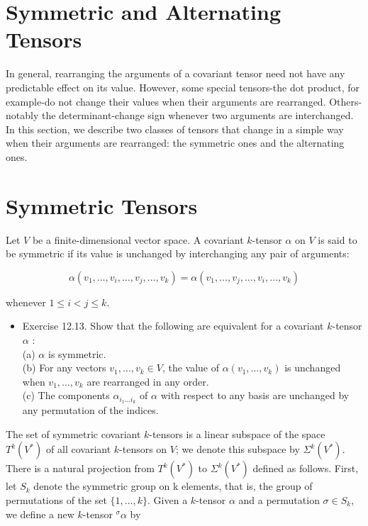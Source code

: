 \documentclass[10pt, letterpaper]{article}
\begin{document}
\section*{Symmetric and Alternating Tensors}
In general, rearranging the arguments of a covariant tensor need not have any predictable effect on its value. However, some special tensors-the dot product, for example-do not change their values when their arguments are rearranged. Others-notably the determinant-change sign whenever two arguments are interchanged. In this section, we describe two classes of tensors that change in a simple way when their arguments are rearranged: the symmetric ones and the alternating ones.

\section*{Symmetric Tensors}
Let $V$ be a finite-dimensional vector space. A covariant $k$-tensor $\alpha$ on $V$ is said to be symmetric if its value is unchanged by interchanging any pair of arguments:

$$
\alpha\left(v_{1}, \ldots, v_{i}, \ldots, v_{j}, \ldots, v_{k}\right)=\alpha\left(v_{1}, \ldots, v_{j}, \ldots, v_{i}, \ldots, v_{k}\right)
$$

whenever $1 \leq i<j \leq k$.

\begin{itemize}
  \item Exercise 12.13. Show that the following are equivalent for a covariant $k$-tensor $\alpha$ :\\
(a) $\alpha$ is symmetric.\\
(b) For any vectors $v_{1}, \ldots, v_{k} \in V$, the value of $\alpha\left(v_{1}, \ldots, v_{k}\right)$ is unchanged when $v_{1}, \ldots, v_{k}$ are rearranged in any order.\\
(c) The components $\alpha_{i_{1} \ldots i_{k}}$ of $\alpha$ with respect to any basis are unchanged by any permutation of the indices.
\end{itemize}

The set of symmetric covariant $k$-tensors is a linear subspace of the space $T^{k}\left(V^{*}\right)$ of all covariant $k$-tensors on $V$; we denote this subspace by $\Sigma^{k}\left(V^{*}\right)$. There is a natural projection from $T^{k}\left(V^{*}\right)$ to $\Sigma^{k}\left(V^{*}\right)$ defined as follows. First, let $S_{k}$ denote the symmetric group on k elements, that is, the group of permutations of the set $\{1, \ldots, k\}$. Given a $k$-tensor $\alpha$ and a permutation $\sigma \in S_{k}$, we define a new $k$-tensor ${ }^{\sigma} \alpha$ by
\end{document}
